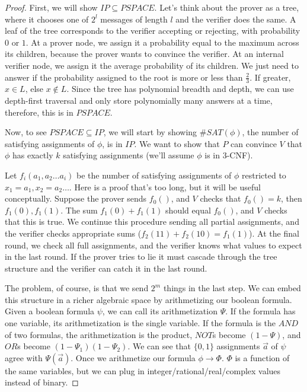 \begin{proof}
	
	First, we will show $IP\subseteq PSPACE$.  Let's think about the prover as a tree, where it chooses one of $2^l$ messages of length $l$ and the verifier does the same.  A leaf of the tree corresponds to the verifier accepting or rejecting, with probability $0$ or $1$.  At a prover node, we assign it a probability equal to the maximum across its children, because the prover wants to convince the verifier.  At an internal verifier node, we assign it the average probability of its children.  We just need to answer if the probability assigned to the root is more or less than $\frac{2}{3}$.  If greater, $x\in L$, else $x\notin L$.  Since the tree has polynomial breadth and depth, we can use depth-first traversal and only store polynomially many answers at a time, therefore, this is in $PSPACE$.
	
	Now, to see $PSPACE\subseteq IP$, we will start by showing $\#SAT(\phi)$, the number of satisfying assignments of $\phi$, is in $IP$.  We want to show that $P$ can convince $V$ that $\phi$ has exactly $k$ satisfying assignments (we'll assume $\phi$ is in $3$-CNF).
	
	Let $f_i(a_1,a_2\dots a_i)$ be the number of satisfying assignments of $\phi$ restricted to $x_1=a_1,x_2=a_2\dots$.  Here is a proof that's too long, but it will be useful conceptually.  Suppose the prover sends $f_0()$, and $V$ checks that $f_0()=k$, then $f_1(0),f_1(1)$.  The sum  $f_1(0) +f_1(1)$ should equal $f_0()$, and $V$ checks that this is true.  We continue this procedure sending all partial assignments, and the verifier checks appropriate sums ($f_2(11)+f_2(10)=f_1(1)$).  At the final round, we check all full assignments, and the verifier knows what values to expect in the last round.  If the prover tries to lie it must cascade through the tree structure and the verifier can catch it in the last round.
	
	The problem, of course, is that we send $2^m$ things in the last step. We can embed this structure in a richer algebraic space by arithmetizing our boolean formula.  Given a boolean formula $\psi$, we can call its arithmetization $\Psi$.  If the formula has one variable, its arithmetization is the single variable.  If the formula is the $AND$ of two formulas, the arithmetization is the product, $NOT$s become $(1-\Psi)$, and $OR$s become $(1-\Psi_1)(1-\Psi_2)$.  We can see that $\{0,1\}$ assignments $\vec{a}$ of $\psi$ agree with $\Psi(\vec{a})$.  Once we arithmetize our formula $\phi \rightarrow \Phi$.  $\Phi$ is a function of the same variables, but we can plug in integer/rational/real/complex values instead of binary.
	

\end{proof}
